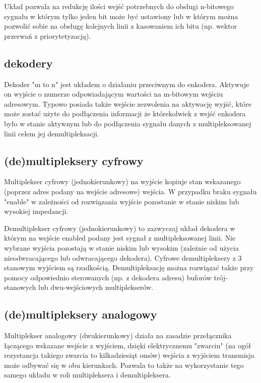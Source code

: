 \documentclass{pdfBooklets}
\begin{document}
Układ pozwala na redukcję ilości wejść potrzebnych do obsługi n-bitowego sygnału w którym tylko jeden bit może być ustawiony lub w którym można pozwolić sobie na obsługę kolejnych linii z kasowaniem ich bitu (np. wektor przerwań z priorytetyzacją).

\subsection{dekodery}

Dekoder "m to n" jest układem o działaniu przeciwnym do enkodera. Aktywuje on wyjście o numerze odpowiadającym wartości na m-bitowym wejściu adresowym. Typowo posiada także wejście zezwolenia na aktywację wyjść, które może zostać użyte do podłączenia informacji że którekolwiek z wejść enkodera było w stanie aktywnym lub do podłączenia sygnału danych z multipleksowanej linii celem jej demultipleksacji.

\subsection{(de)multipleksery cyfrowy}

Multiplekser cyfrowy (jednokierunkowy) na wyjście kopiuje stan wskazanego (poprzez adres podany na wejście adresowe) wejścia. W przypadku braku sygnału "enable" w zależności od rozwiązania wyjście pozostanie w stanie niskim lub wysokiej impedancji.

Demultiplekser cyfrowy (jednokierunkowy) to zazwyczaj układ dekodera w którym na wejście enabled podany jest sygnał z multipleksowanej linii. Nie wybrane wyjścia pozostają w stanie niskim lub wysokim (zależnie od użycia nieodwracającego lub odwracającego dekodera). Cyfrowe demultipleksery z 3 stanowym wyjściem są rzadkością. Demultipleksację można rozwiązać także przy pomocy odpowiednio sterowanych (np. z dekodera adresu) buforów trój-stanowych lub dwu-wejściowych multiplekserów.

\subsection{(de)multipleksery analogowy}

Multiplekser analogowy (dwukierunkowy) działa na zasadzie przełącznika łączącego wskazane wejście z wyjściem, dzięki elektrycznemu "zwarciu" (na ogół rezystancja takiego zwarcia to kilkadziesiąt omów) wejścia z wyjściem transmisja może odbywać się w obu kierunkach. Pozwala to także na wykorzystanie tego samego układu w roli multipleksera i demultipleksera.
\end{document}
